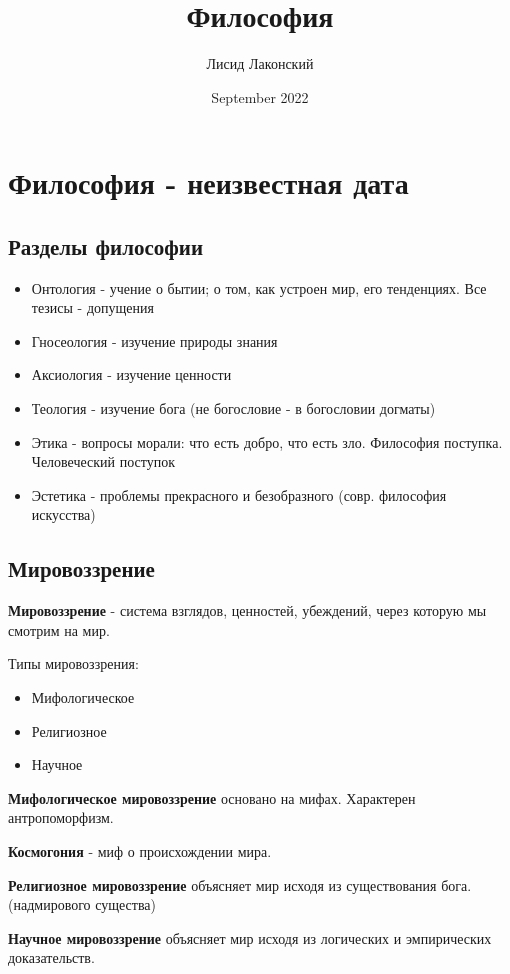 \documentclass{article}
\title{Философия}
\author{Лисид Лаконский}
\date{September 2022}
\begin{document}
\maketitle
\tableofcontents
\pagebreak

\section{Философия - неизвестная дата}

\begin{flushleft}

\subsection{Разделы философии}

\begin{itemize}
    \item Онтология - учение о бытии; о том, как устроен мир, его тенденциях. Все тезисы - допущения
    \item Гносеология - изучение природы знания
    \item Аксиология - изучение ценности
    \item Теология - изучение бога (не богословие - в богословии догматы)
    \item Этика - вопросы морали: что есть добро, что есть зло. Философия поступка. Человеческий поступок
    \item Эстетика - проблемы прекрасного и безобразного (совр. философия искусства)
\end{itemize}

\subsection{Мировоззрение}

\textbf{Мировоззрение} - система взглядов, ценностей, убеждений, через которую мы смотрим на мир.

Типы мировоззрения:

\begin{itemize}
    \item Мифологическое
    \item Религиозное
    \item Научное
\end{itemize}

\textbf{Мифологическое мировоззрение} основано на мифах. Характерен антропоморфизм.

\textbf{Космогония} - миф о происхождении мира.

\hfill

\textbf{Религиозное мировоззрение} объясняет мир исходя из существования бога. (надмирового существа)

\hfill

\textbf{Научное мировоззрение} объясняет мир исходя из логических и эмпирических доказательств.

\end{flushleft}
\end{document}
